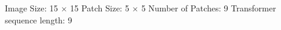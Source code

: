\documentclass[preview]{standalone}
\begin{document}
\begin{center}
Image Size: 15 $\times$ 15 \n Patch Size: 5 $\times$ 5 \n Number of Patches: 9 \n Transformer sequence length: 9
\end{center}
\end{document}
